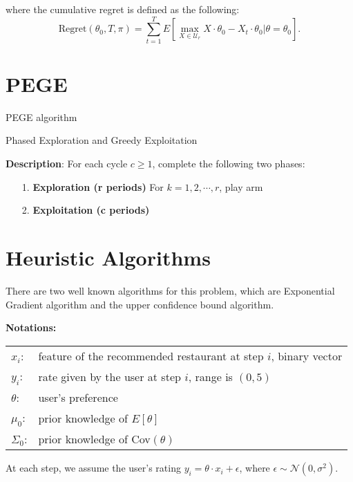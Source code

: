\documentclass{article}
\begin{document}
where the cumulative regret is defined as the following:
\begin{equation}
\text{Regret}(\theta_{0},T,\pi)=\sum_{t=1}^{T}E\left[\max_{X\in \mathcal{U}_{r}}X\cdot\theta_{0}-X_{t}\cdot \theta_{0}|\theta=\theta_{0}\right].
\end{equation}





\section{PEGE}

PEGE algorithm
\begin{algorithm}
\caption{Phased Exploration and Greedy Exploitation}
\textbf{Description}: For each cycle $c\geq 1$, complete the following two phases:
\begin{itemize}
\item [1. ] \textbf{Exploration (r periods)} For $k=1,2,\cdots,r$, play arm 
\item [2. ] \textbf{Exploitation (c periods)}
\end{itemize}
\end{algorithm}


\section{Heuristic Algorithms}
There are two well known algorithms for this problem, which are Exponential Gradient algorithm and the upper confidence bound algorithm.\

\textbf{Notations: }

\begin{center}
\begin{tabular}{ll}
${x}_i$: & feature of the recommended restaurant at step $i$, binary vector\\
$y_i$: & rate given by the user at step $i$, range is $(0,5)$\\
${\theta}$: & user's preference\\
${\mu_0}$: & prior knowledge of ${E}[{\theta}]$ \\
$\Sigma_0$: & prior knowledge of Cov$(\theta)$
\end{tabular}
\end{center}

At each step, we assume the user's rating $y_i = \theta\cdot {x}_i+\epsilon$, where $\epsilon\sim\mathcal{N}(0,\sigma^2)$.
\end{document}
